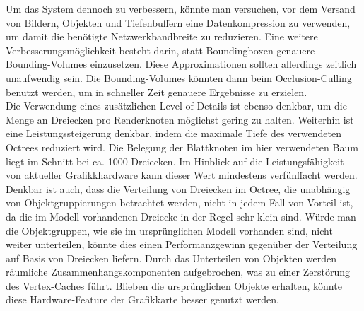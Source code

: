Um das System dennoch zu verbessern, könnte man versuchen, vor dem Versand von Bildern, Objekten und Tiefenbuffern eine Datenkompression zu verwenden, um damit die benötigte Netzwerkbandbreite zu reduzieren. Eine weitere Verbesserungsmöglichkeit besteht darin, statt Boundingboxen genauere Bounding-Volumes einzusetzen. Diese Approximationen sollten allerdings zeitlich unaufwendig sein. Die Bounding-Volumes könnten dann beim Occlusion-Culling benutzt werden, um in schneller Zeit genauere Ergebnisse zu erzielen.\\
Die Verwendung eines zusätzlichen Level-of-Details ist ebenso denkbar, um die Menge an Dreiecken pro Renderknoten möglichst gering zu halten. Weiterhin ist eine Leistungssteigerung denkbar, indem die maximale Tiefe des verwendeten Octrees reduziert wird. Die Belegung der Blattknoten im hier verwendeten Baum liegt im Schnitt bei ca. 1000 Dreiecken. Im Hinblick auf die Leistungsfähigkeit von aktueller Grafikkhardware kann dieser Wert mindestens verfünffacht werden. Denkbar ist auch, dass die Verteilung von Dreiecken im Octree, die unabhängig von Objektgruppierungen betrachtet werden, nicht in jedem Fall von Vorteil ist, da die im Modell vorhandenen Dreiecke in der Regel sehr klein sind. Würde man die Objektgruppen, wie sie im ursprünglichen Modell vorhanden sind, nicht weiter unterteilen, könnte dies einen Performanzgewinn gegenüber der Verteilung auf Basis von Dreiecken liefern. Durch das Unterteilen von Objekten werden räumliche Zusammenhangskomponenten aufgebrochen, was zu einer Zerstörung des Vertex-Caches führt. Blieben die ursprünglichen Objekte erhalten, könnte diese Hardware-Feature der Grafikkarte besser genutzt werden.

%
%
